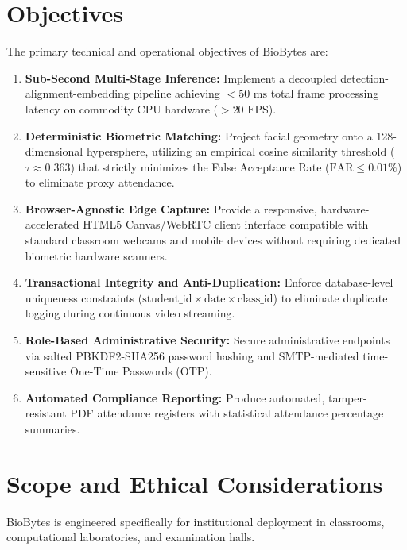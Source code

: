\section{Objectives}
The primary technical and operational objectives of BioBytes are:
\begin{enumerate}
    \item \textbf{Sub-Second Multi-Stage Inference:} Implement a decoupled detection-alignment-embedding pipeline achieving $< 50\text{ ms}$ total frame processing latency on commodity CPU hardware ($> 20\text{ FPS}$).
    \item \textbf{Deterministic Biometric Matching:} Project facial geometry onto a 128-dimensional hypersphere, utilizing an empirical cosine similarity threshold ($\tau \approx 0.363$) that strictly minimizes the False Acceptance Rate ($\text{FAR} \leq 0.01\%$) to eliminate proxy attendance.
    \item \textbf{Browser-Agnostic Edge Capture:} Provide a responsive, hardware-accelerated HTML5 Canvas/WebRTC client interface compatible with standard classroom webcams and mobile devices without requiring dedicated biometric hardware scanners.
    \item \textbf{Transactional Integrity and Anti-Duplication:} Enforce database-level uniqueness constraints ($\text{student\_id} \times \text{date} \times \text{class\_id}$) to eliminate duplicate logging during continuous video streaming.
    \item \textbf{Role-Based Administrative Security:} Secure administrative endpoints via salted PBKDF2-SHA256 password hashing and SMTP-mediated time-sensitive One-Time Passwords (OTP).
    \item \textbf{Automated Compliance Reporting:} Produce automated, tamper-resistant PDF attendance registers with statistical attendance percentage summaries.
\end{enumerate}

\section{Scope and Ethical Considerations}
BioBytes is engineered specifically for institutional deployment in classrooms, computational laboratories, and examination halls. 

